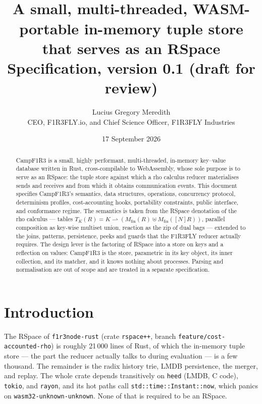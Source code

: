 \documentclass[11pt]{article}
\title{\textbf{\Camp}\\[4pt]
\large A small, multi-threaded, WASM-portable in-memory tuple store\\ that serves as an RSpace\\[6pt]
\normalsize Specification, version 0.1 (draft for review)}
\author{Lucius Gregory Meredith\\
\small CEO, F1R3FLY.io, and Chief Science Officer, F1R3FLY Industries}
\date{17 September 2026}
\theoremstyle{plain}
\theoremstyle{definition}
\newcommand{\Camp}{CampF1R3}
\newcommand{\Mfin}{M_{\mathrm{fin}}}
\newcommand{\rr}{\rightharpoonup}
\newcommand{\code}[1]{\texttt{#1}}
\begin{document}
\maketitle

\begin{abstract}
\Camp{} is a small, highly performant, multi-threaded, in-memory key--value
database written in Rust, cross-compilable to WebAssembly, whose sole purpose is
to serve as an RSpace: the tuple store against which a rho calculus reducer
materialises sends and receives and from which it obtains communication events.
This document specifies \Camp{}'s semantics, data structures, operations,
concurrency protocol, determinism profiles, cost-accounting hooks, portability
constraints, public interface, and conformance regime. The semantics is taken from
the RSpace denotation of the rho calculus --- tables $T_K(R)=K\rr(\Mfin(R)\uplus
\Mfin([N]R))$, parallel composition as key-wise multiset union, reaction as the
zip of dual bags --- extended to the joins, patterns, persistence, peeks and
guards that the F1R3FLY reducer actually requires. The design lever is the
factoring of RSpace into a store on keys and a reflection on values: \Camp{} is
the store, parametric in its key object, its inner collection, and its matcher,
and it knows nothing about processes. Parsing and normalisation are out of scope
and are treated in a separate specification.
\end{abstract}

\tableofcontents

\section{Introduction}\label{sec:intro}

The RSpace of \code{f1r3node-rust} (crate \code{rspace++}, branch
\code{feature/cost-accounted-rho}) is roughly 21\,000 lines of Rust, of which the
in-memory tuple store --- the part the reducer actually talks to during
evaluation --- is a few thousand. The remainder is the radix history trie, LMDB
persistence, the merger, and replay. The whole crate depends transitively on
\code{heed} (LMDB, C code), \code{tokio}, and \code{rayon}, and its hot paths
call \code{std::time::Instant::now}, which panics on
\code{wasm32-unknown-unknown}. None of that is required to be an RSpace.
\end{document}
